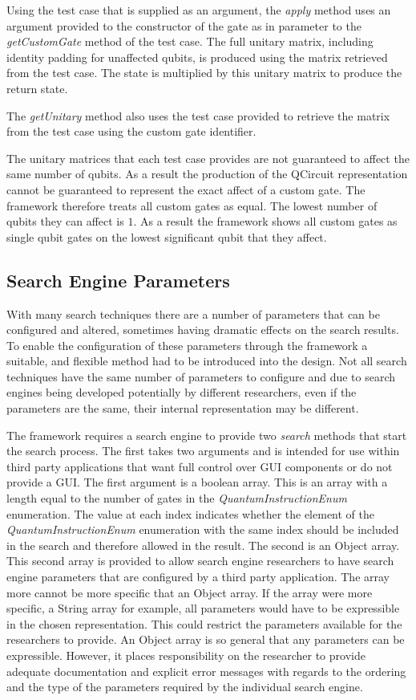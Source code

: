 Using the test case that is supplied as an argument, the \emph{apply} method uses an argument provided to the constructor of the gate as in parameter to the \emph{getCustomGate} method of the test case.
The full unitary matrix, including identity padding for unaffected qubits, is produced using the matrix retrieved from the test case.
The state is multiplied by this unitary matrix to produce the return state.

The \emph{getUnitary} method also uses the test case provided to retrieve the matrix from the test case using the custom gate identifier.

The unitary matrices that each test case provides are not guaranteed to affect the same number of qubits.
As a result the production of the QCircuit representation cannot be guaranteed to represent the exact affect of a custom gate.
The framework therefore treats all custom gates as equal.
The lowest number of qubits they can affect is $1$.
As a result the framework shows all custom gates as single qubit gates on the lowest significant qubit that they affect.

\subsection{Search Engine Parameters}
With many search techniques there are a number of parameters that can be configured and altered, sometimes having dramatic effects on the search results.
To enable the configuration of these parameters through the framework a suitable, and flexible method had to be introduced into the design.
Not all search techniques have the same number of parameters to configure and due to search engines being developed potentially by different researchers, even if the parameters are the same, their internal representation may be different.

The framework requires a search engine to provide two \emph{search} methods that start the search process.
The first takes two arguments and is intended for use within third party applications that want full control over GUI components or do not provide a GUI.
The first argument is a boolean array.
This is an array with a length equal to the number of gates in the \emph{QuantumInstructionEnum} enumeration.
The value at each index indicates whether the element of the \emph{QuantumInstructionEnum} enumeration with the same index should be included in the search and therefore allowed in the result.
The second is an Object array.
This second array is provided to allow search engine researchers to have search engine parameters that are configured by a third party application.
The array more cannot be more specific that an Object array.
If the array were more specific, a String array for example, all parameters would have to be expressible in the chosen representation.
This could restrict the parameters available for the researchers to provide.
An Object array is so general that any parameters can be expressible.
However, it places responsibility on the researcher to provide adequate documentation and explicit error messages with regards to the ordering and the type of the parameters required by the individual search engine.

